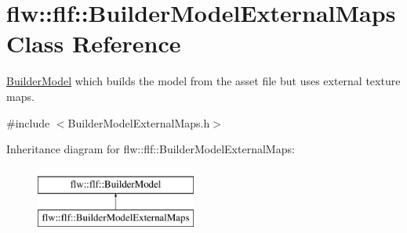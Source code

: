 \hypertarget{classflw_1_1flf_1_1BuilderModelExternalMaps}{}\section{flw\+:\+:flf\+:\+:Builder\+Model\+External\+Maps Class Reference}
\label{classflw_1_1flf_1_1BuilderModelExternalMaps}


\hyperlink{classflw_1_1flf_1_1BuilderModel}{Builder\+Model} which builds the model from the asset file but uses external texture maps.  




{\ttfamily \#include $<$Builder\+Model\+External\+Maps.\+h$>$}

Inheritance diagram for flw\+:\+:flf\+:\+:Builder\+Model\+External\+Maps\+:\begin{figure}[H]
\begin{center}
\leavevmode
\includegraphics[height=2.000000cm]{classflw_1_1flf_1_1BuilderModelExternalMaps}
\end{center}
\end{figure}
